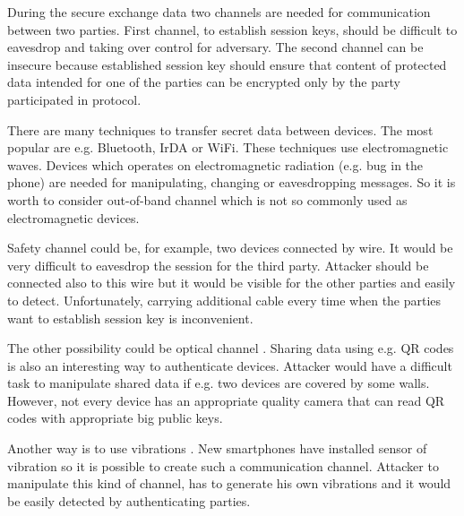 \documentclass[11pt,titlepage]{article}
\theoremstyle{plain}
\begin{document}
\vspace{5mm}

During the secure exchange data two channels are needed for communication between two parties. First channel, to establish session keys, should be difficult to eavesdrop and taking over control for adversary. The second channel can be insecure because established session key should ensure that content of protected data intended for one of the parties can be encrypted only by the party participated in protocol. 


\vspace{5mm}

There are many techniques to transfer secret data between devices. The most popular are e.g. Bluetooth, IrDA or WiFi. These techniques use electromagnetic waves. Devices which operates on electromagnetic radiation (e.g. bug in the phone) are needed for manipulating, changing or eavesdropping messages. So it is worth to consider out-of-band channel which is not so commonly used as electromagnetic devices.

\vspace{5mm}

Safety channel could be, for example, two devices connected by wire. It would be very difficult to eavesdrop the session for the third party. Attacker should be connected also to this wire but it would be visible for the other parties and easily to detect. Unfortunately, carrying additional cable every time when the parties want to establish session key is inconvenient.

\vspace{5mm}

The other possibility could be optical channel \cite{QRcode}. Sharing data using e.g. QR codes is also an interesting way to authenticate devices. Attacker would have a difficult task to manipulate shared data if e.g. two devices are covered by some walls. However, not every device has an appropriate quality camera that can read QR codes with appropriate big public keys.

\vspace{5mm}

Another way is to use vibrations \cite{vibrat}. New smartphones have installed sensor of vibration so it is possible to create such a communication channel. Attacker to manipulate this kind of channel, has to generate his own vibrations and it would be easily detected by authenticating parties.
\end{document}
